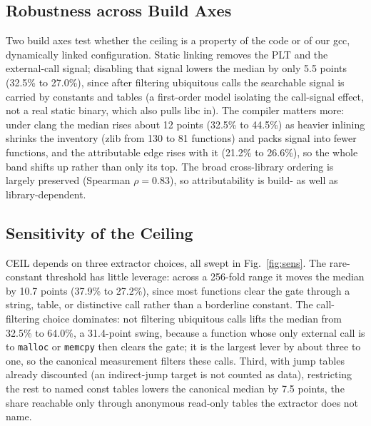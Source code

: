 \documentclass[conference]{IEEEtran}
\begin{document}
\subsection{Robustness across Build Axes}
Two build axes test whether the ceiling is a property of the code or of our gcc,
dynamically linked configuration. Static linking removes the PLT and the external-call
signal; disabling that signal lowers the median by only 5.5 points (32.5\% to 27.0\%),
since after filtering ubiquitous calls the searchable signal is carried by constants and
tables (a first-order model isolating the call-signal effect, not a real static binary,
which also pulls libc in). The compiler matters more: under clang the median rises about
12 points (32.5\% to 44.5\%) as heavier inlining shrinks the inventory (zlib from 130
to 81 functions) and packs signal into fewer functions, and the attributable edge rises
with it (21.2\% to 26.6\%), so the whole band shifts up rather than only its top. The
broad cross-library ordering is largely preserved (Spearman $\rho=0.83$), so
attributability is build- as well as library-dependent.

\subsection{Sensitivity of the Ceiling}
CEIL depends on three extractor choices, all swept in Fig.~\ref{fig:sens}. The
rare-constant threshold has little leverage: across a 256-fold range it moves the
median by 10.7 points (37.9\% to 27.2\%), since most functions clear the gate through a
string, table, or distinctive call rather than a borderline constant. The
call-filtering choice dominates: not filtering ubiquitous calls lifts the median from
32.5\% to 64.0\%, a 31.4-point swing, because a function whose only external call is to
\texttt{malloc} or \texttt{memcpy} then clears the gate; it is the largest lever by
about three to one, so the canonical measurement filters these calls. Third, with jump
tables already discounted (an indirect-jump target is not counted as data), restricting
the rest to named const tables lowers the canonical median by 7.5 points, the share
reachable only through anonymous read-only tables the extractor does not name.
\end{document}
